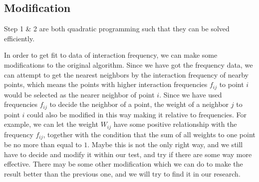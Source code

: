 \documentclass[12pt]{article} %
\begin{document}

\subsection{Modification}
Step 1 \& 2 are both quadratic programming such that they can be solved efficiently.

In order to get fit to data of interaction frequency, we can make some modifications to the original algorithm. Since we have got the frequency data, we can attempt to get the nearest neighbors by the interaction frequency of nearby points, which means the points with higher interaction frequencies $f_{ij}$ to point $i$ would be selected as the nearer neighbor of point $i$. Since we have used frequencies $f_{ij}$ to decide the neighbor of a point, the weight of a neighbor $j$ to point $i$ could also be modified in this way making it relative to frequencies. For example, we can let the weight $W_{ij}$ have some positive relationship with the frequency $f_{ij}$, together with the condition that the sum of all weights to one point be no more than equal to $1$. Maybe this is not the only right way, and we still have to decide and modify it within our test, and try if there are some way more effective. There may be some other modification which we can do to make the result better than the previous one, and we will try to find it in our research.

\end{document}
